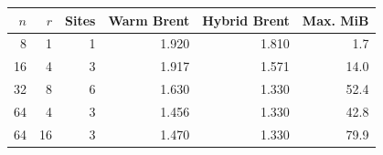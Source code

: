 \begin{tabular}{rrrrrr}
\toprule
$n$ & $r$ & Sites & Warm Brent & Hybrid Brent & Max. MiB\\
\midrule
8 & 1 & 1 & 1.920 & 1.810 & 1.7\\
16 & 4 & 3 & 1.917 & 1.571 & 14.0\\
32 & 8 & 6 & 1.630 & 1.330 & 52.4\\
64 & 4 & 3 & 1.456 & 1.330 & 42.8\\
64 & 16 & 3 & 1.470 & 1.330 & 79.9\\
\bottomrule
\end{tabular}
